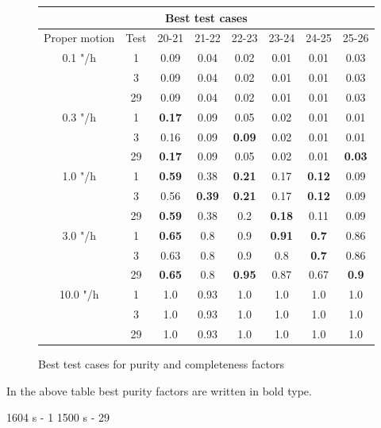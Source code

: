 \documentclass{article}
\begin{document}
\begin{figure}[H]
\centering
\begin{tabular}{|c|c|c|c|c|c|c|c|}
\hline
\multicolumn{8}{|c|}{Best test cases}\\
\hline \hline
Proper motion & Test & 20-21 & 21-22 & 22-23 & 23-24 & 24-25 & 25-26\\
\hline \hline
0.1 "/h & 1 & 0.09 & 0.04 & 0.02  & 0.01 & 0.01 & 0.03\\
\cline{2-8}
& 3 & 0.09 & 0.04 & 0.02  & 0.01 & 0.01 & 0.03\\
\cline{2-8}
& 29 & 0.09 & 0.04 & 0.02  & 0.01 & 0.01 & 0.03\\
\hline
0.3 "/h & 1 & \textbf{0.17} & 0.09 & 0.05 & 0.02 & 0.01 & 0.01\\
\cline{2-8}
& 3 & 0.16 & 0.09 & \textbf{0.09}  & 0.02 & 0.01 & 0.01\\
\cline{2-8}
& 29 & \textbf{0.17} & 0.09 & 0.05 & 0.02 & 0.01 & \textbf{0.03}\\
\hline
1.0 "/h & 1 & \textbf{0.59} & 0.38 & \textbf{0.21} & 0.17 & \textbf{0.12} & 0.09\\
\cline{2-8}
& 3 & 0.56 & \textbf{0.39} & \textbf{0.21}  & 0.17 & \textbf{0.12} & 0.09\\
\cline{2-8}
& 29 & \textbf{0.59} & 0.38 & 0.2 & \textbf{0.18} & 0.11 & 0.09\\
\hline
3.0 "/h & 1 & \textbf{0.65} & 0.8 & 0.9 & \textbf{0.91} & \textbf{0.7} & 0.86\\
\cline{2-8}
& 3 & 0.63 & 0.8 & 0.9  & 0.8 & \textbf{0.7} & 0.86\\
\cline{2-8}
& 29 & \textbf{0.65} & 0.8 & \textbf{0.95} & 0.87 & 0.67 & \textbf{0.9}\\
\hline
10.0 "/h & 1 & 1.0 & 0.93 & 1.0 & 1.0 & 1.0 & 1.0\\
\cline{2-8}
& 3 & 1.0 & 0.93 & 1.0  & 1.0 & 1.0 & 1.0\\
\cline{2-8}
& 29 & 1.0 & 0.93 & 1.0  & 1.0 & 1.0 & 1.0\\
\hline
\end{tabular}
\caption{Best test cases for purity and completeness factors}
\end{figure}

In the above table best purity factors are written in bold type.

1604 s - 1
1500 s - 29
\end{document}
